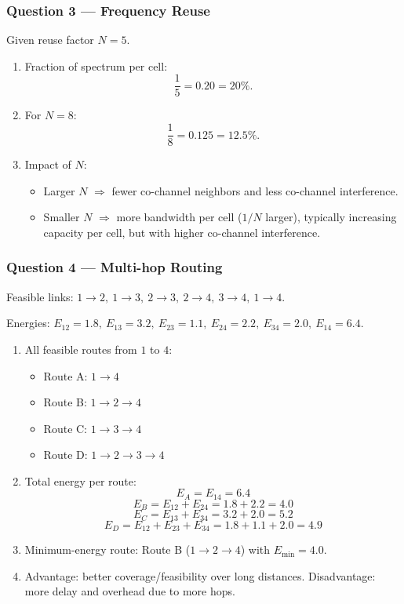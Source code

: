 \documentclass[11pt,a4paper]{article}
\begin{document}
\subsubsection*{Question 3 --- Frequency Reuse}
Given reuse factor $N=5$.

\begin{enumerate}[label=\alph*.]
    \item Fraction of spectrum per cell:
    \[
    \frac{1}{5}=0.20=20\%.
    \]
    \item For $N=8$:
    \[
    \frac{1}{8}=0.125=12.5\%.
    \]
    \item Impact of $N$:
    \begin{itemize}
        \item Larger $N$ $\Rightarrow$ fewer co-channel neighbors and less co-channel interference.
        \item Smaller $N$ $\Rightarrow$ more bandwidth per cell ($1/N$ larger), typically increasing capacity per cell, but with higher co-channel interference.
    \end{itemize}
    
\end{enumerate}

\subsubsection*{Question 4 --- Multi-hop Routing}
Feasible links: $1\to 2,\ 1\to 3,\ 2\to 3,\ 2\to 4,\ 3\to 4,\ 1\to 4$.

Energies: $E_{12}=1.8,\ E_{13}=3.2,\ E_{23}=1.1,\ E_{24}=2.2,\ E_{34}=2.0,\ E_{14}=6.4$.

\begin{enumerate}[label=\alph*.]
    \item All feasible routes from $1$ to $4$:
    \begin{itemize}
        \item Route A: $1\to 4$
        \item Route B: $1\to 2\to 4$
        \item Route C: $1\to 3\to 4$
        \item Route D: $1\to 2\to 3\to 4$
    \end{itemize}
    \item Total energy per route:
    \[
    E_A=E_{14}=6.4
    \]
    \[
    E_B=E_{12}+E_{24}=1.8+2.2=4.0
    \]
    \[
    E_C=E_{13}+E_{34}=3.2+2.0=5.2
    \]
    \[
    E_D=E_{12}+E_{23}+E_{34}=1.8+1.1+2.0=4.9
    \]
    \item Minimum-energy route: Route B ($1\to 2\to 4$) with $E_{\min}=4.0$.
    \item Advantage: better coverage/feasibility over long distances. Disadvantage: more delay and overhead due to more hops.
\end{enumerate}
\end{document}
